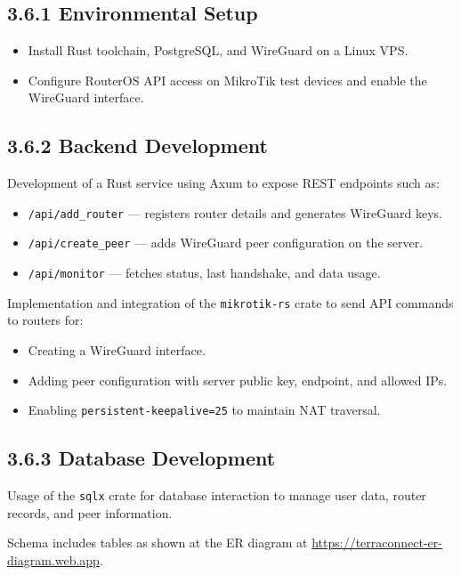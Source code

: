 \documentclass[12pt,a4paper,oneside]{report}
\begin{document}
\subsection{3.6.1 Environmental Setup}

\begin{itemize}
  \item Install Rust toolchain, PostgreSQL, and WireGuard on a Linux VPS.
  \item Configure RouterOS API access on MikroTik test devices and enable the WireGuard interface.
\end{itemize}

\subsection{3.6.2 Backend Development}

Development of a Rust service using Axum to expose REST endpoints such as:

\begin{itemize}
  \item \texttt{/api/add\_router} --- registers router details and generates WireGuard keys.
  \item \texttt{/api/create\_peer} --- adds WireGuard peer configuration on the server.
  \item \texttt{/api/monitor} --- fetches status, last handshake, and data usage.
\end{itemize}

Implementation and integration of the \texttt{mikrotik-rs} crate to send API commands to routers for:

\begin{itemize}
  \item Creating a WireGuard interface.
  \item Adding peer configuration with server public key, endpoint, and allowed IPs.
  \item Enabling \texttt{persistent-keepalive=25} to maintain NAT traversal.
\end{itemize}

\subsection{3.6.3 Database Development}

Usage of the \texttt{sqlx} crate for database interaction to manage user data, router records, and peer information.

Schema includes tables as shown at the ER diagram at \href{https://terraconnect-er-diagram.web.app}{https://terraconnect-er-diagram.web.app}.
\end{document}
